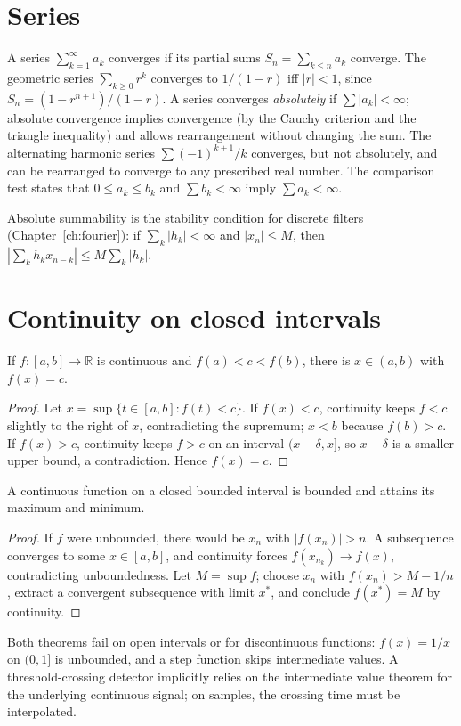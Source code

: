 \section{Series}
A series $\sum_{k=1}^\infty a_k$ converges if its partial sums $S_n=\sum_{k\le n}a_k$ converge. The geometric series $\sum_{k\ge0}r^k$ converges to $1/(1-r)$ iff $|r|<1$, since $S_n=(1-r^{n+1})/(1-r)$. A series converges \emph{absolutely} if $\sum|a_k|<\infty$; absolute convergence implies convergence (by the Cauchy criterion and the triangle inequality) and allows rearrangement without changing the sum. The alternating harmonic series $\sum(-1)^{k+1}/k$ converges, but not absolutely, and can be rearranged to converge to any prescribed real number. The comparison test states that $0\le a_k\le b_k$ and $\sum b_k<\infty$ imply $\sum a_k<\infty$.

Absolute summability is the stability condition for discrete filters (Chapter~\ref{ch:fourier}): if $\sum_k|h_k|<\infty$ and $|x_n|\le M$, then $|\sum_kh_kx_{n-k}|\le M\sum_k|h_k|$.

\section{Continuity on closed intervals}
\begin{theorem}
If $f:[a,b]\to\mathbb R$ is continuous and $f(a)<c<f(b)$, there is $x\in(a,b)$ with $f(x)=c$.
\end{theorem}
\begin{proof}
Let $x=\sup\{t\in[a,b]:f(t)<c\}$. If $f(x)<c$, continuity keeps $f<c$ slightly to the right of $x$, contradicting the supremum; $x<b$ because $f(b)>c$. If $f(x)>c$, continuity keeps $f>c$ on an interval $(x-\delta,x]$, so $x-\delta$ is a smaller upper bound, a contradiction. Hence $f(x)=c$.
\end{proof}

\begin{theorem}
A continuous function on a closed bounded interval is bounded and attains its maximum and minimum.
\end{theorem}
\begin{proof}
If $f$ were unbounded, there would be $x_n$ with $|f(x_n)|>n$. A subsequence converges to some $x\in[a,b]$, and continuity forces $f(x_{n_k})\to f(x)$, contradicting unboundedness. Let $M=\sup f$; choose $x_n$ with $f(x_n)>M-1/n$, extract a convergent subsequence with limit $x^\ast$, and conclude $f(x^\ast)=M$ by continuity.
\end{proof}
Both theorems fail on open intervals or for discontinuous functions: $f(x)=1/x$ on $(0,1]$ is unbounded, and a step function skips intermediate values. A threshold-crossing detector implicitly relies on the intermediate value theorem for the underlying continuous signal; on samples, the crossing time must be interpolated.

